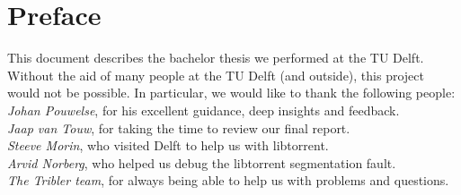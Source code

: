 \chapter*{Preface}
This document describes the bachelor thesis we performed at the TU Delft. Without the aid of many people at the TU Delft (and outside), this project would not be possible. In particular, we would like to thank the following people: \\

\emph{Johan Pouwelse}, for his excellent guidance, deep insights and feedback.\\

\emph{Jaap van Touw}, for taking the time to review our final report.\\

\emph{Steeve Morin}, who visited Delft to help us with libtorrent.\\

\emph{Arvid Norberg}, who helped us debug the libtorrent segmentation fault.\\

\emph{The Tribler team}, for always being able to help us with problems and questions.
